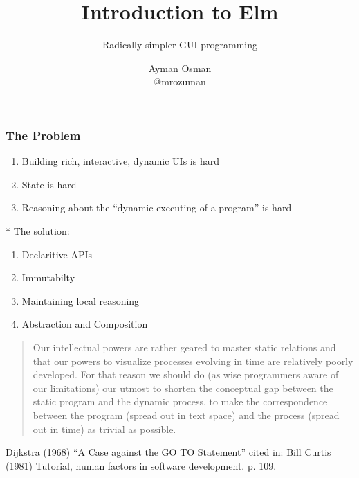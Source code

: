 \documentclass{beamer}
\title{Introduction to Elm}
\subtitle{Radically simpler GUI programming}
\author[Ayman Osman]{
  Ayman Osman
  \\ @mrozuman
}
\begin{document}
\begin{frame}
  \titlepage
\end{frame}


\begin{frame}
  \frametitle{The Problem}
  \begin{enumerate}
  \item Building rich, interactive, dynamic UIs is hard
  \item State is hard
  \item Reasoning about the ``dynamic executing of a program'' is hard
  \end{enumerate}

  \pause
* The solution:

\begin{enumerate}
\item Declaritive APIs
\item Immutabilty
\item Maintaining local reasoning
\item Abstraction and Composition
\end{enumerate}

\end{frame}

\begin{frame}
  
  \begin{quotation}
    Our intellectual powers are rather geared to master static relations and
that our powers to visualize processes evolving in time are relatively poorly
developed. For that reason we should do (as wise programmers aware of our
limitations) our utmost to shorten the conceptual gap between the static program
and the dynamic process, to make the correspondence between the program (spread
out in text space) and the process (spread out in time) as trivial as possible.
  \end{quotation}

  Dijkstra (1968) ``A Case against the GO TO Statement'' cited in: Bill Curtis
  (1981) Tutorial, human factors in software development. p. 109.
  
\end{frame}



\end{document}
